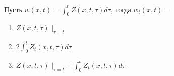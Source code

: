 Пусть \(w\left(x,t\right)=\int_{0}^{t} Z\left(x,t,\tau \right)d\tau\), тогда \(w_t\left(x,t\right)=\)

\begin{enumerate}[label=\arabic*)]
    \item \(Z\left(x,t,\tau \right)\) \(\vert _{\tau =t}\)
    \item 2\(\int_{0}^{t} Z_t\left(x,t,\tau \right)d\tau\)
    \item \(Z\left(x,t,\tau \right)\) \(\vert _{\tau =t}+\int_{0}^{t} Z_t\left(x,t,\tau \right)d\tau\)
\end{enumerate}

